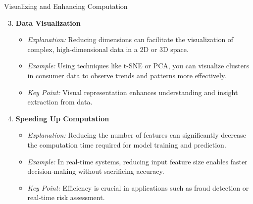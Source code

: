\documentclass[aspectratio=169]{beamer}
\begin{document}
\begin{frame}[fragile]{Visualizing and Enhancing Computation}
    \begin{enumerate}
        \setcounter{enumi}{2}
        \item \textbf{Data Visualization}
            \begin{itemize}
                \item \textit{Explanation:} Reducing dimensions can facilitate the visualization of complex, high-dimensional data in a 2D or 3D space.
                \item \textit{Example:} Using techniques like t-SNE or PCA, you can visualize clusters in consumer data to observe trends and patterns more effectively.
                \item \textit{Key Point:} Visual representation enhances understanding and insight extraction from data.
            \end{itemize}
        
        \item \textbf{Speeding Up Computation}
            \begin{itemize}
                \item \textit{Explanation:} Reducing the number of features can significantly decrease the computation time required for model training and prediction.
                \item \textit{Example:} In real-time systems, reducing input feature size enables faster decision-making without sacrificing accuracy.
                \item \textit{Key Point:} Efficiency is crucial in applications such as fraud detection or real-time risk assessment.
            \end{itemize}
    \end{enumerate}    
\end{frame}
\end{document}
